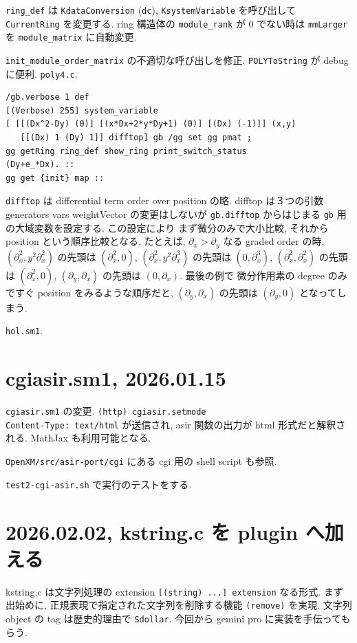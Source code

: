 \documentclass{jarticle}
\def\pd#1{\partial_{#1}}
\begin{document}
{\tt ring\_def} は {\tt KdataConversion} ({\tt dc}), {\tt KsystemVariable} を呼び出して {\tt CurrentRing} を変更する.
ring 構造体の {\tt module\_rank} が 0 でない時は
{\tt mmLarger} を {\tt module\_matrix} に自動変更.

{\tt init\_module\_order\_matrix} の不適切な呼び出しを修正.
{\tt POLYToString} が debug に便利. {\tt poly4.c}.

{\footnotesize
\begin{verbatim}
/gb.verbose 1 def
[(Verbose) 255] system_variable
[ [[(Dx^2-Dy) (0)] [(x*Dx+2*y*Dy+1) (0)] [(Dx) (-1)]] (x,y) 
   [[(Dx) 1 (Dy) 1]] difftop] gb /gg set gg pmat ;
gg getRing ring_def show_ring print_switch_status
(Dy+e_*Dx). ::
gg get {init} map ::
\end{verbatim}
}

{\tt difftop} は differential term order over position  の略.
difftop は３つの引数 generators vars weightVector の変更はしないが
{\tt gb.difftop} からはじまる {\tt gb} 用の大域変数を設定する.
この設定により
まず微分のみで大小比較, それから position という順序比較となる.
たとえば, $\pd{x}>\pd{y}$ なる graded order の時,
$ (\pd{x}^2, y^2\pd{x}^2)$ の先頭は $(\pd{x}^2,0)$,
$ (\pd{x}^2, y^2\pd{x}^3)$ の先頭は $(0,\pd{x}^3)$,
$ (\pd{x}^2, \pd{x}^2)$ の先頭は $(\pd{x}^2,0)$,
$ (\pd{y}, \pd{x})$ の先頭は $(0,\pd{x})$.
最後の例で 微分作用素の degree のみですぐ position をみるような順序だと,
$ (\pd{y}, \pd{x})$ の先頭は $(\pd{y},0)$ となってしまう.

{\tt hol.sm1}.

\section{cgiasir.sm1, 2026.01.15}

{\tt cgiasir.sm1} の変更.
{\tt (http) cgiasir.setmode} \\
{\tt Content-Type: text/html} が送信され,
asir 関数の出力が html 形式だと解釈される.
MathJax も利用可能となる.

{\tt OpenXM/src/asir-port/cgi} にある
cgi 用の shell script も参照.

{\tt test2-cgi-asir.sh} で実行のテストをする.

\section{2026.02.02, kstring.c を plugin へ加える}

kstring.c は文字列処理の extension {\tt [(string) ...] extension} なる形式.
まず出始めに, 正規表現で指定された文字列を削除する機能 {\tt (remove)} を実現.
文字列 object の tag は歴史的理由で {\tt Sdollar}.
今回から gemini pro に実装を手伝ってもらう.
\end{document}
